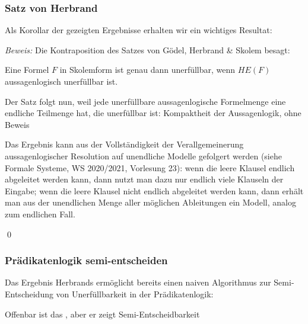 \documentclass[aspectratio=1610,onlymath]{beamer}
\begin{document}
\begin{frame}\frametitle{Satz von Herbrand}

Als Korollar der gezeigten Ergebnisse erhalten wir ein wichtiges Resultat:


\pause\emph{Beweis:} Die Kontraposition des Satzes von Gödel, Herbrand \& Skolem besagt:\medskip

Eine Formel $F$ in Skolemform ist genau dann unerfüllbar, wenn $HE(F)$ aussagenlogisch unerfüllbar ist.\bigskip

Der Satz folgt nun, weil jede unerfüllbare aussagenlogische Formelmenge eine endliche
Teilmenge hat, die unerfüllbar ist: \alert{Kompaktheit der Aussagenlogik}, ohne Beweis\\[1ex]
{\tiny
\textcolor{devilscss}{Das Ergebnis kann aus der Vollständigkeit der Verallgemeinerung aussagenlogischer Resolution auf unendliche Modelle gefolgert werden (siehe Formale Systeme, WS 2020/2021, Vorlesung 23): wenn die leere Klausel endlich abgeleitet werden kann, dann nutzt man dazu nur endlich viele Klauseln der Eingabe; wenn die leere Klausel nicht endlich abgeleitet werden kann, dann erhält man aus der unendlichen Menge aller möglichen Ableitungen ein Modell, analog zum endlichen Fall.}

}\qed

\end{frame}

\begin{frame}\frametitle{Prädikatenlogik semi-entscheiden}

Das Ergebnis Herbrands ermöglicht bereits einen naiven Algorithmus zur Semi-Entscheidung von Unerfüllbarkeit in der Prädikatenlogik:\bigskip

\medskip

Offenbar ist das , aber er zeigt Semi-Entscheidbarkeit

\end{frame}
\end{document}
